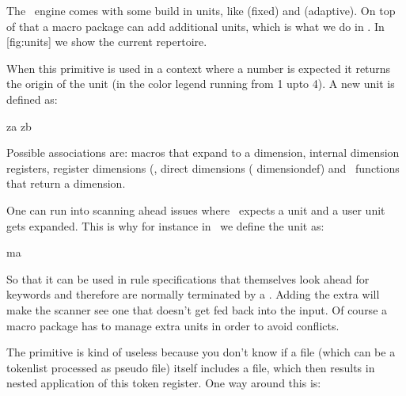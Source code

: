 \startnewprimitive[title={\prm {associateunit}}]

The \TEX\ engine comes with some build in units, like  (fixed) and
 (adaptive). On top of that a macro package can add additional units, which is
what we do in \CONTEXT. In  [fig:units] we show the current repertoire.

\startplacefigure[title=Available units,reference=fig:units]
    \showunitsmap[tight]
    \showunitsmaplegend
\stopplacefigure

When this primitive is used in a context where a number is expected it returns the origin
of the unit (in the color legend running from 1 upto 4). A new unit is defined as:

\starttyping
\newdimen\MyDimenZA  \MyDimenZA=10pt

\protected\def\MyDimenAB{\dimexpr\hsize/2\relax}

\associateunit za \MyDimenZA
\associateunit zb \MyMacroZB
\stoptyping

Possible associations are: macros that expand to a dimension, internal dimension
registers, register dimensions (, direct dimensions (\prm
{dimensiondef}) and \LUA\ functions that return a dimension.

One can run into scanning ahead issues where \TEX\ expects a unit and a user unit
gets expanded. This is why for instance in \CONTEXT\ we define the  unit
as:

\starttyping
\protected\def\mathaxisunit{\scaledmathaxis\mathstyle\norelax}

\associateunit ma \mathaxisunit %
\stoptyping

So that it can be used in rule specifications that themselves look ahead for
keywords and therefore are normally terminated by a . Adding the
extra  will make the scanner see one that doesn't get fed back into
the input. Of course a macro package has to manage extra units in order to avoid
conflicts.

\stopnewprimitive

\startnewprimitive[title={\prm {atendoffile}}]

The  primitive is kind of useless because you don't know if a file
(which can be a tokenlist processed as pseudo file) itself includes a file, which
then results in nested application of this token register. One way around this is:

\startbuffer
\atendoffile\SomeCommand
\stopbuffer

